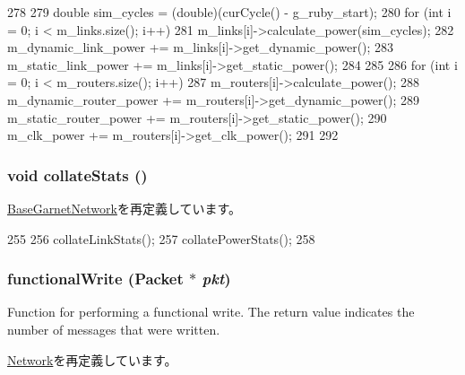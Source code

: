 \begin{DoxyCode}
278 {
279     double sim_cycles = (double)(curCycle() - g_ruby_start);
280     for (int i = 0; i < m_links.size(); i++) {
281         m_links[i]->calculate_power(sim_cycles);
282         m_dynamic_link_power += m_links[i]->get_dynamic_power();
283         m_static_link_power += m_links[i]->get_static_power();
284     }
285 
286     for (int i = 0; i < m_routers.size(); i++) {
287         m_routers[i]->calculate_power();
288         m_dynamic_router_power += m_routers[i]->get_dynamic_power();
289         m_static_router_power += m_routers[i]->get_static_power();
290         m_clk_power += m_routers[i]->get_clk_power();
291     }
292 }
\end{DoxyCode}
\hypertarget{classGarnetNetwork__d_a208669cbc0bb1d52565956ca8c690c55}{
\subsubsection[{collateStats}]{\setlength{\rightskip}{0pt plus 5cm}void collateStats ()}}
\label{classGarnetNetwork__d_a208669cbc0bb1d52565956ca8c690c55}


\hyperlink{classBaseGarnetNetwork_ae3089fd60541650eefd9605c2c1abc68}{BaseGarnetNetwork}を再定義しています。


\begin{DoxyCode}
255 {
256     collateLinkStats();
257     collatePowerStats();
258 }
\end{DoxyCode}
\hypertarget{classGarnetNetwork__d_ad07b9def1d6f5e5f988a254c3a9d1ad9}{
\subsubsection[{functionalWrite}]{ functionalWrite ({\bf Packet} $\ast$ {\em pkt})}}
\label{classGarnetNetwork__d_ad07b9def1d6f5e5f988a254c3a9d1ad9}
Function for performing a functional write. The return value indicates the number of messages that were written. 

\hyperlink{classNetwork_a31a4b7e2a90a59a684d84d1284683986}{Network}を再定義しています。


